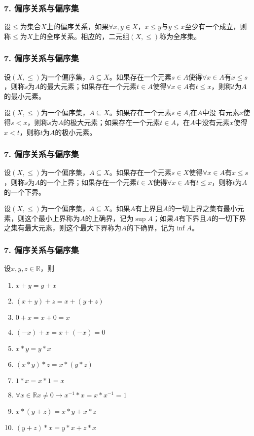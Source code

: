 \documentclass{beamer}
\begin{document}
\begin{CJK*}{UTF8}{gbsn}
\begin{frame}
\frametitle{7. 偏序关系与偏序集}
  \begin{Def}\justifying\let\raggedright\justifying
    设$\leq$为集合$X$上的偏序关系，如果$\forall x, y \in X$，$x \leq y$与$y \leq x$至少有一个成立，则称$\leq$为$X$上的\alert{全序关系}。相应的，二元组$(X,\leq)$称为\alert{全序集}。
  \end{Def}
\end{frame}
\begin{frame}
  \frametitle{7. 偏序关系与偏序集}
  \begin{Def}
    设$(X,\leq)$为一个偏序集，$A\subseteq X$。如果存在一个元素$s\in A$使得$\forall x \in A$有$x \leq s$，则称$s$为$A$的\alert{最大元素}；如果存在一个元素$t\in A$使得$\forall x \in A$有$t \leq x$，则称$t$为$A$的\alert{最小元素}。
  \end{Def}
    \begin{Def}
    设$(X,\leq)$为一个偏序集，$A\subseteq X$。如果存在一个元素$s\in A$,在$A$中没
    有元素$x$使得$s < x$，则称$s$为$A$的\alert{极大元素}；如果存在一个元素$t\in A$，在$A$中没有元素$x$使得$x < t$，则称$t$为$A$的\alert{极小元素}。
  \end{Def}
\end{frame}
\begin{frame}
  \frametitle{7. 偏序关系与偏序集}
  \begin{Def}
    设$(X,\leq)$为一个偏序集，$A\subseteq X$。如果存在一个元素$s\in X$使得$\forall x \in A$有$x \leq s$，则称$s$为$A$的一个\alert{上界}；如果存在一个元素$t\in X$使得$\forall x \in A$有$t \leq x$，则称$t$为$A$的一个\alert{下界}。
  \end{Def}
    \begin{Def}
      设$(X,\leq)$为一个偏序集，$A\subseteq X$。如果$A$有上界且$A$的一切上界之集有最小元素，则这个最小上界称为$A$的\alert{上确界}，记为$\sup A$；如果$A$有下界且$A$的一切下界之集有最大元素，则这个最大下界称为$A$的\alert{下确界}，记为$\inf A$。
  \end{Def}
\end{frame}

\begin{frame}
  \frametitle{7. 偏序关系与偏序集}
   设$x, y, z \in \mathbb{R}$，则
   \begin{enumerate}
   \item   $x + y = y + x$
   \item   $(x + y) + z = x + (y + z)$
   \item   $0 + x = x + 0 = x$
   \item   $(-x) + x = x + (-x)= 0$
   \item   $x * y = y * x$
   \item   $(x * y) * z = x * (y *z)$
   \item   $1 * x = x * 1 = x$
   \item   $\forall x \in \mathbb{R} x \neq 0 \to x^{-1} * x = x * x^{-1} = 1$
   \item   $x* (y + z) = x * y + x * z$
   \item   $(y + z) * x = y * x + z * x$
   

\end{enumerate}
\end{frame}
\end{CJK*}
\end{document}
